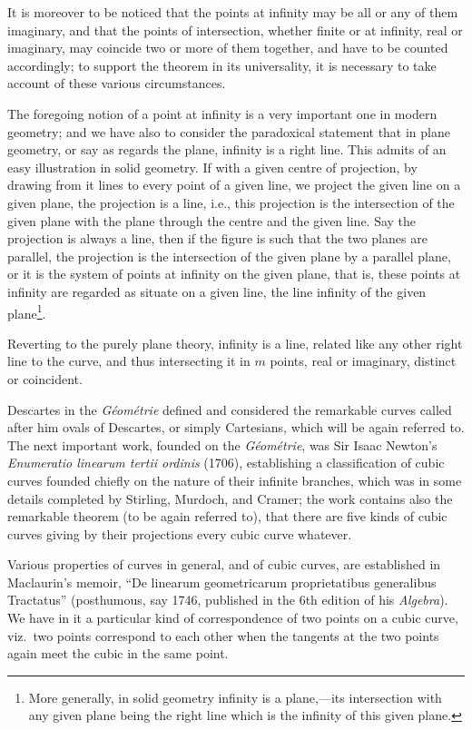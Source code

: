 \documentclass[12pt,a4paper,oneside]{book}
\begin{document}
It is moreover to be noticed that the points at infinity may be all or any of them imaginary, and that the points of intersection, whether finite or at infinity, real or imaginary, may coincide two or more of them together, and have to be counted accordingly; to support the theorem in its universality, it is necessary to take account of these various circumstances.

The foregoing notion of a point at infinity is a very important one in modern geometry; and we have also to consider the paradoxical statement that in plane geometry, or say as regards the plane, infinity is a right line. This admits of an easy illustration in solid geometry. If with a given centre of projection, by drawing from it lines to every point of a given line, we project the given line on a given plane, the projection is a line, i.e., this projection is the intersection of the given plane with the plane through the centre and the given line. Say the projection is always a line, then if the figure is such that the two planes are parallel, the projection is the intersection of the given plane by a parallel plane, or it is the system of points at infinity on the given plane, that is, these points at infinity are regarded as situate on a given line, the line infinity of the given plane\footnote{More generally, in solid geometry infinity is a plane,---its intersection with any given plane being the right line which is the infinity of this given plane.}.

Reverting to the purely plane theory, infinity is a line, related like any other right line to the curve, and thus intersecting it in $m$ points, real or imaginary, distinct or coincident.

Descartes in the \textit{G\'eom\'etrie} defined and considered the remarkable curves called after him ovals of Descartes, or simply Cartesians, which will be again referred to. The next important work, founded on the \textit{G\'eom\'etrie}, was Sir Isaac Newton's \textit{Enumeratio linearum tertii ordinis} (1706), establishing a classification of cubic curves founded chiefly on the nature of their infinite branches, which was in some details completed by Stirling, Murdoch, and Cramer; the work contains also the remarkable theorem (to be again referred to), that there are five kinds of cubic curves giving by their projections every cubic curve whatever.

Various properties of curves in general, and of cubic curves, are established in Maclaurin's memoir, ``De linearum geometricarum proprietatibus generalibus Tractatus'' (posthumous, say 1746, published in the 6th edition of his \textit{Algebra}). We have in it a particular kind of correspondence of two points on a cubic curve, viz.\ two points correspond to each other when the tangents at the two points again meet the cubic in the same point.
\end{document}
